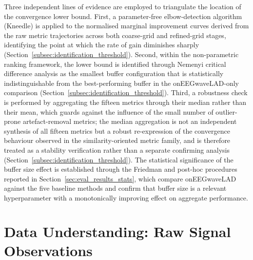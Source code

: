 \documentclass[MScCS,12pt,oneside,final]{uccthesis}
\begin{document}
Three independent lines of evidence are employed to triangulate the location of the convergence lower bound. First, a parameter-free elbow-detection algorithm (Kneedle) is applied to the normalised marginal improvement curves derived from the raw metric trajectories across both coarse-grid and refined-grid stages, identifying the point at which the rate of gain diminishes sharply (Section~\ref{subsec:identification_threshold}). Second, within the non-parametric ranking framework, the lower bound is identified through Nemenyi critical difference analysis as the smallest buffer configuration that is statistically indistinguishable from the best-performing buffer in the onEEGwaveLAD-only comparison (Section~\ref{subsec:identification_threshold}). Third, a robustness check is performed by aggregating the fifteen metrics through their median rather than their mean, which guards against the influence of the small number of outlier-prone artefact-removal metrics; the median aggregation is not an independent synthesis of all fifteen metrics but a robust re-expression of the convergence behaviour observed in the similarity-oriented metric family, and is therefore treated as a stability verification rather than a separate confirming analysis (Section~\ref{subsec:identification_threshold}). The statistical significance of the buffer size effect is established through the Friedman and post-hoc procedures reported in Section~\ref{sec:eval_results_stats}, which compare onEEGwaveLAD against the five baseline methods and confirm that buffer size is a relevant hyperparameter with a monotonically improving effect on aggregate performance.

\section{Data Understanding: Raw Signal Observations}
\label{sec:results_data_understanding}
\end{document}
